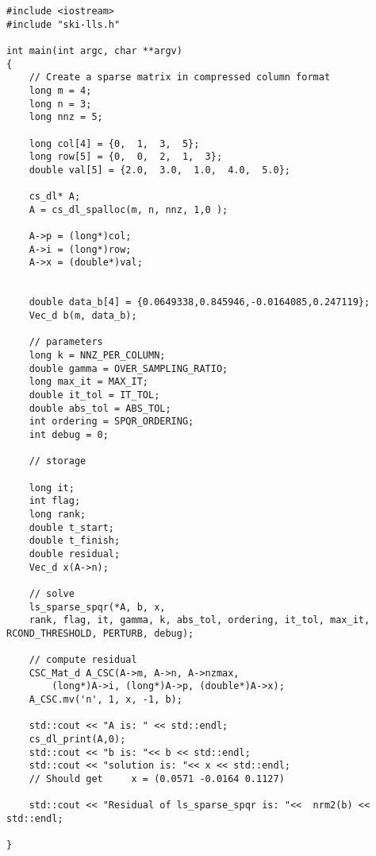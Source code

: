 \documentclass[english,11pt]{article}
\begin{document}
\begin{lstlisting}[breaklines=true, showstringspaces=false]
#include <iostream>
#include "ski-lls.h"

int main(int argc, char **argv)
{
	// Create a sparse matrix in compressed column format
    long m = 4;
    long n = 3;
    long nnz = 5;

    long col[4] = {0,  1,  3,  5};
    long row[5] = {0,  0,  2,  1,  3}; 
    double val[5] = {2.0,  3.0,  1.0,  4.0,  5.0};

    cs_dl* A;
    A = cs_dl_spalloc(m, n, nnz, 1,0 );

    A->p = (long*)col;
    A->i = (long*)row;
    A->x = (double*)val;


    double data_b[4] = {0.0649338,0.845946,-0.0164085,0.247119};
    Vec_d b(m, data_b);

    // parameters
    long k = NNZ_PER_COLUMN;
    double gamma = OVER_SAMPLING_RATIO;
    long max_it = MAX_IT;
    double it_tol = IT_TOL;
    double abs_tol = ABS_TOL;
    int ordering = SPQR_ORDERING;
    int debug = 0;

    // storage

    long it;
    int flag;
    long rank;
    double t_start;
    double t_finish;
    double residual;   
    Vec_d x(A->n);

    // solve
    ls_sparse_spqr(*A, b, x, 
    rank, flag, it, gamma, k, abs_tol, ordering, it_tol, max_it, RCOND_THRESHOLD, PERTURB, debug);

    // compute residual
    CSC_Mat_d A_CSC(A->m, A->n, A->nzmax, 
        (long*)A->i, (long*)A->p, (double*)A->x);
    A_CSC.mv('n', 1, x, -1, b);

    std::cout << "A is: " << std::endl;
    cs_dl_print(A,0);
    std::cout << "b is: "<< b << std::endl;
    std::cout << "solution is: "<< x << std::endl;
    // Should get     x = (0.0571 -0.0164 0.1127)

    std::cout << "Residual of ls_sparse_spqr is: "<<  nrm2(b) << std::endl;

}
\end{lstlisting}

 


\appendix
\end{document}

